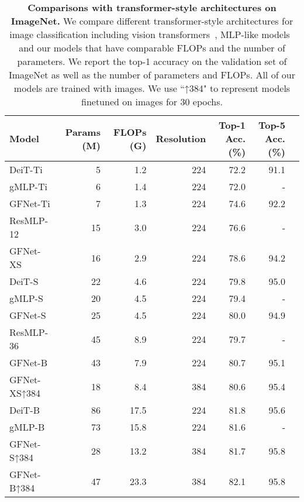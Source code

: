 \documentclass{article}
\numberwithin{equation}{section}
\begin{document}
\begin{table}[t]
  \centering
\caption{\textbf{Comparisons with transformer-style architectures on ImageNet.} We compare different transformer-style architectures for image classification including vision transformers~\cite{touvron2020deit}, MLP-like models~\cite{touvron2021resmlp,liu2021pay} and our models that have comparable FLOPs and the number of parameters. We report the top-1 accuracy on the validation set of ImageNet as well as the number of parameters and FLOPs. All of our models are trained with  images. We use ``↑384" to represent models finetuned on  images for 30 epochs. } \vspace{5pt}
    \begin{tabular}{lrrrrrr}\toprule
    Model & Params (M) & FLOPs (G) & Resolution & Top-1 Acc. (\%) & Top-5  Acc.  (\%) \\ \midrule
     DeiT-Ti~\cite{touvron2020deit} & 5    & 1.2  & 224   & 72.2 &  91.1  \\
     gMLP-Ti~\cite{liu2021pay} & 6     & 1.4   & 224   & 72.0  & - \\
     \rowcolor{Gray} GFNet-Ti  & 7 & 1.3 & 224  & 74.6 & 92.2 \\ \midrule
     ResMLP-12~\cite{touvron2021resmlp} & 15    & 3.0   & 224   & 76.6  & - \\
     \rowcolor{Gray} GFNet-XS & 16 & 2.9 & 224 & 78.6 & 94.2\\ \midrule
     DeiT-S~\cite{touvron2020deit} & 22    & 4.6   & 224   & 79.8  & 95.0  \\
     gMLP-S~\cite{liu2021pay} & 20    & 4.5   & 224   & 79.4  & - \\
     \rowcolor{Gray} GFNet-S & 25 & 4.5 & 224 & 80.0 & 94.9\\ \midrule
     ResMLP-36~\cite{touvron2021resmlp} & 45    & 8.9   & 224   & 79.7  & - \\
     \rowcolor{Gray} GFNet-B & 43 & 7.9 & 224 & 80.7 & 95.1 \\ 
     \rowcolor{Gray} GFNet-XS↑384 & 18 & 8.4& 384 &  80.6 & 95.4\\ \midrule
     DeiT-B~\cite{touvron2020deit} & 86    & 17.5  & 224   & 81.8  & 95.6 \\
     gMLP-B~\cite{liu2021pay} & 73    & 15.8  & 224   & 81.6  & - \\
     \rowcolor{Gray} GFNet-S↑384 & 28 &  13.2 & 384 & 81.7 & 95.8\\
     \rowcolor{Gray} GFNet-B↑384  & 47 & 23.3 & 384 & 82.1 & 95.8\\ \bottomrule
    \end{tabular}\label{tab:main1} 
\end{table}
\end{document}
